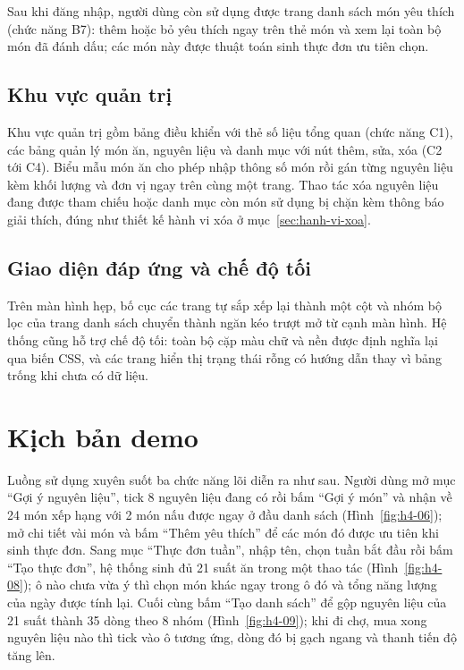 Sau khi đăng nhập, người dùng còn sử dụng được trang danh sách món yêu thích
(chức năng B7): thêm hoặc bỏ yêu thích ngay trên thẻ món và xem lại toàn bộ món
đã đánh dấu; các món này được thuật toán sinh thực đơn ưu tiên chọn.

\subsection{Khu vực quản trị}

Khu vực quản trị gồm bảng điều khiển với thẻ số liệu tổng quan (chức năng C1),
các bảng quản lý món ăn, nguyên liệu và danh mục với nút thêm, sửa, xóa (C2 tới
C4). Biểu mẫu món ăn cho phép nhập thông số món rồi gán từng nguyên liệu kèm
khối lượng và đơn vị ngay trên cùng một trang. Thao tác xóa nguyên liệu đang
được tham chiếu hoặc danh mục còn món sử dụng bị chặn kèm thông báo giải thích,
đúng như thiết kế hành vi xóa ở mục~\ref{sec:hanh-vi-xoa}.

\subsection{Giao diện đáp ứng và chế độ tối}

Trên màn hình hẹp, bố cục các trang tự sắp xếp lại thành một cột và nhóm bộ lọc
của trang danh sách chuyển thành ngăn kéo trượt mở từ cạnh màn hình. Hệ thống
cũng hỗ trợ chế độ tối: toàn bộ cặp màu chữ và
nền được định nghĩa lại qua biến CSS, và các trang hiển thị trạng thái rỗng có
hướng dẫn thay vì bảng trống khi chưa có dữ liệu.

\section{Kịch bản demo}
\label{sec:demo}

Luồng sử dụng xuyên suốt ba chức năng lõi diễn ra như sau. Người dùng mở mục
``Gợi ý nguyên liệu'', tick 8 nguyên liệu đang có rồi bấm ``Gợi ý món'' và nhận
về 24 món xếp hạng với 2 món nấu được ngay ở đầu danh sách
(Hình~\ref{fig:h4-06}); mở chi tiết vài món và bấm ``Thêm yêu thích'' để các món
đó được ưu tiên khi sinh thực đơn. Sang mục ``Thực đơn tuần'', nhập tên, chọn
tuần bắt đầu rồi bấm ``Tạo thực đơn'', hệ thống sinh đủ 21 suất ăn trong một
thao tác (Hình~\ref{fig:h4-08}); ô nào chưa vừa ý thì chọn món khác ngay trong ô
đó và tổng năng lượng của ngày được tính lại. Cuối cùng bấm ``Tạo danh sách'' để
gộp nguyên liệu của 21 suất thành 35 dòng theo 8 nhóm (Hình~\ref{fig:h4-09});
khi đi chợ, mua xong nguyên liệu nào thì tick vào ô tương ứng, dòng đó bị gạch
ngang và thanh tiến độ tăng lên.

